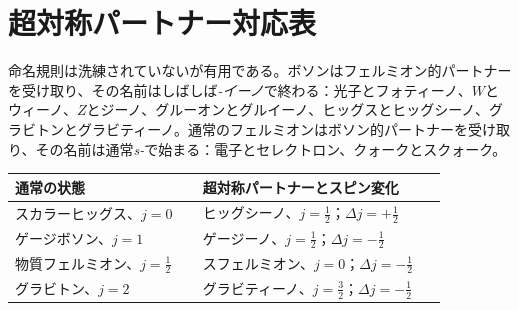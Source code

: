 \begin{classroomqa}
\end{classroomqa}

\begin{classroomqa}
\end{classroomqa}

\section{超対称パートナー対応表}

命名規則は洗練されていないが有用である。ボソンはフェルミオン的パートナーを受け取り、その名前はしばしば\emph{-イーノ}で終わる：光子とフォティーノ、\(W\)とウィーノ、\(Z\)とジーノ、グルーオンとグルイーノ、ヒッグスとヒッグシーノ、グラビトンとグラビティーノ。通常のフェルミオンはボソン的パートナーを受け取り、その名前は通常\emph{s-}で始まる：電子とセレクトロン、クォークとスクォーク。

\begin{center}
\begin{tabular}{@{}>{\raggedright\arraybackslash}p{0.40\linewidth}>{\raggedright\arraybackslash}p{0.52\linewidth}@{}}
\toprule
通常の状態 & 超対称パートナーとスピン変化\\
\midrule
スカラーヒッグス、\(j=0\) & ヒッグシーノ、\(j=\tfrac12\)；\(\Delta j=+\tfrac12\)\\
ゲージボソン、\(j=1\) & ゲージーノ、\(j=\tfrac12\)；\(\Delta j=-\tfrac12\)\\
物質フェルミオン、\(j=\tfrac12\) & スフェルミオン、\(j=0\)；\(\Delta j=-\tfrac12\)\\
グラビトン、\(j=2\) & グラビティーノ、\(j=\tfrac32\)；\(\Delta j=-\tfrac12\)\\
\bottomrule
\end{tabular}
\end{center}

